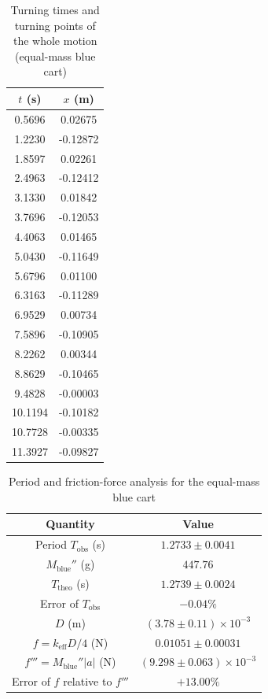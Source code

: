 \begin{table}[htb!]
\centering
\caption{Turning times and turning points of the whole motion (equal-mass blue cart)}
\begin{tabular}{cc}
\toprule
$t$ (\unit{\s}) & $x$ (\unit{\m}) \\
\midrule
0.5696 & 0.02675 \\
1.2230 & -0.12872 \\
1.8597 & 0.02261 \\
2.4963 & -0.12412 \\
3.1330 & 0.01842 \\
3.7696 & -0.12053 \\
4.4063 & 0.01465 \\
5.0430 & -0.11649 \\
5.6796 & 0.01100 \\
6.3163 & -0.11289 \\
6.9529 & 0.00734 \\
7.5896 & -0.10905 \\
8.2262 & 0.00344 \\
8.8629 & -0.10465 \\
9.4828 & -0.00003 \\
10.1194 & -0.10182 \\
10.7728 & -0.00335 \\
11.3927 & -0.09827 \\
\bottomrule
\end{tabular}
\end{table}
\begin{table}[htb!]
\centering
\caption{Period and friction-force analysis for the equal-mass blue cart}
\begin{tabular}{cc}
\toprule
Quantity & Value \\
\midrule
Period $T_{\text{obs}}$ (\unit{\s}) & $1.2733 \pm 0.0041$ \\
$M_{\text{blue}}''$ (\unit{\g}) & $447.76$ \\
$T_{\text{theo}}$ (\unit{\s}) & $1.2739 \pm 0.0024$ \\
Error of $T_{\text{obs}}$ & $-0.04\%$ \\
$D$ (\unit{\m}) & $(3.78 \pm 0.11)\times 10^{-3}$ \\
$f=k_{\text{eff}}D/4$ (\unit{\N}) & $0.01051 \pm 0.00031$ \\
$f'''=M_{\text{blue}}''|a|$ (\unit{\N}) & $(9.298 \pm 0.063)\times 10^{-3}$ \\
Error of $f$ relative to $f'''$ & $+13.00\%$ \\
\bottomrule
\end{tabular}
\end{table}
